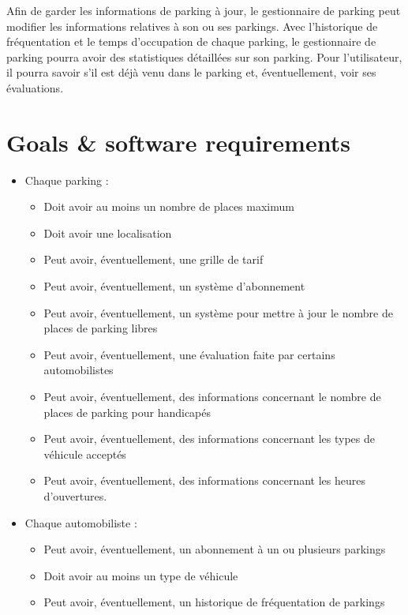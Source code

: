\documentclass[a4paper,11pt]{article}
\begin{document}
Afin de garder les informations de parking à jour, le gestionnaire de parking peut modifier les informations relatives à son ou ses parkings.  Avec l'historique de fréquentation et le temps d'occupation de chaque parking, le gestionnaire de parking pourra avoir des statistiques détaillées sur son parking.  Pour l'utilisateur, il pourra savoir s'il est déjà venu dans le parking et, éventuellement, voir ses évaluations.

\section{Goals \& software requirements}

\begin{itemize}
  \item Chaque parking :
  \begin{itemize}
    \item Doit avoir au moins un nombre de places maximum
    \item Doit avoir une localisation
    \item Peut avoir, éventuellement, une grille de tarif
    \item Peut avoir, éventuellement, un système d'abonnement
    \item Peut avoir, éventuellement, un système pour mettre à jour le nombre de places de parking libres
    \item Peut avoir, éventuellement, une évaluation faite par certains automobilistes
    \item Peut avoir, éventuellement, des informations concernant le nombre de places de parking pour handicapés
    \item Peut avoir, éventuellement, des informations concernant les types de véhicule acceptés
    \item Peut avoir, éventuellement, des informations concernant les heures d'ouvertures.
  \end{itemize}
  \item Chaque automobiliste :
  \begin{itemize}
    \item Peut avoir, éventuellement, un abonnement à un ou plusieurs parkings
    \item Doit avoir au moins un type de véhicule
    \item Peut avoir, éventuellement, un historique de fréquentation de parkings
  \end{itemize}
\end{itemize}
\end{document}
